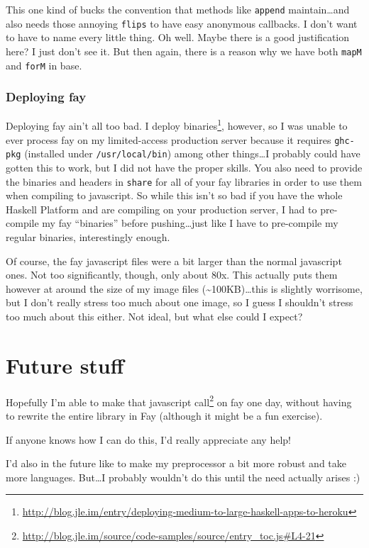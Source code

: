 \documentclass[]{article}
\renewcommand{\href}[2]{#2\footnote{\url{#1}}}
\begin{document}
This one kind of bucks the convention that methods like \texttt{append}
maintain\ldots{}and also needs those annoying \texttt{flips} to have easy
anonymous callbacks. I don't want to have to name every little thing. Oh well.
Maybe there is a good justification here? I just don't see it. But then again,
there is a reason why we have both \texttt{mapM} and \texttt{forM} in base.

\subsubsection{Deploying fay}\label{deploying-fay}

Deploying fay ain't all too bad. I
\href{http://blog.jle.im/entry/deploying-medium-to-large-haskell-apps-to-heroku}{deploy
binaries}, however, so I was unable to ever process fay on my limited-access
production server because it requires \texttt{ghc-pkg} (installed under
\texttt{/usr/local/bin}) among other things\ldots{}I probably could have gotten
this to work, but I did not have the proper skills. You also need to provide the
binaries and headers in \texttt{share} for all of your fay libraries in order to
use them when compiling to javascript. So while this isn't so bad if you have
the whole Haskell Platform and are compiling on your production server, I had to
pre-compile my fay ``binaries'' before pushing\ldots{}just like I have to
pre-compile my regular binaries, interestingly enough.

Of course, the fay javascript files were a bit larger than the normal javascript
ones. Not too significantly, though, only about 80x. This actually puts them
however at around the size of my image files
(\textasciitilde{}100KB)\ldots{}this is slightly worrisome, but I don't really
stress too much about one image, so I guess I shouldn't stress too much about
this either. Not ideal, but what else could I expect?

\section{Future stuff}\label{future-stuff}

Hopefully I'm able to make
\href{http://blog.jle.im/source/code-samples/source/entry_toc.js\#L4-21}{that
javascript call} on fay one day, without having to rewrite the entire library in
Fay (although it might be a fun exercise).

If anyone knows how I can do this, I'd really appreciate any help!

I'd also in the future like to make my preprocessor a bit more robust and take
more languages. But\ldots{}I probably wouldn't do this until the need actually
arises :)
\end{document}
